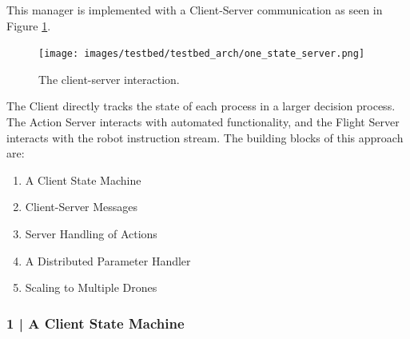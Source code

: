 This manager is implemented with a Client-Server communication as seen in Figure \ref{fig:client-server}.

\begin{figure}[h]
  \raggedright
  \texttt{[image: images/testbed/testbed\_arch/one\_state\_server.png]}
  \caption{The client-server interaction.}
  \label{fig:client-server}
\end{figure}

The Client directly tracks the state of each process in a larger decision process. The Action Server interacts with automated functionality, and the Flight Server interacts with the robot instruction stream. The building blocks of this approach are:

\begin{enumerate}
    \item A Client State Machine
    \item Client-Server Messages
    \item Server Handling of Actions
    \item A Distributed Parameter Handler
    \item Scaling to Multiple Drones
\end{enumerate}



\subsubsection{1 | A Client State Machine}


